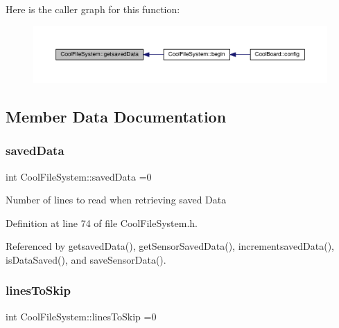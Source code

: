 Here is the caller graph for this function\+:
\nopagebreak
\begin{figure}[H]
\begin{center}
\leavevmode
\includegraphics[width=350pt]{db/d0c/class_cool_file_system_a70701d05e811604af1b531f4f6dc69ed_icgraph}
\end{center}
\end{figure}


\subsection{Member Data Documentation}
\mbox{\label{class_cool_file_system_ad9f5b739a32100f5f21270c3d9ee2b1d}} 
\subsubsection{\texorpdfstring{saved\+Data}{savedData}}
{\footnotesize\ttfamily int Cool\+File\+System\+::saved\+Data =0\hspace{0.3cm}{\ttfamily [private]}}

Number of lines to read when retrieving saved Data 

Definition at line 74 of file Cool\+File\+System.\+h.



Referenced by getsaved\+Data(), get\+Sensor\+Saved\+Data(), incrementsaved\+Data(), is\+Data\+Saved(), and save\+Sensor\+Data().

\mbox{\label{class_cool_file_system_a84fdb6057e534b395512463daa28ea3c}} 
\subsubsection{\texorpdfstring{lines\+To\+Skip}{linesToSkip}}
{\footnotesize\ttfamily int Cool\+File\+System\+::lines\+To\+Skip =0\hspace{0.3cm}{\ttfamily [private]}}

